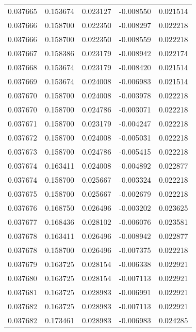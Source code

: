 \begin{tabular}{lrrrr}
0.037665    &  0.153674 &  0.023127 & -0.008550 &             0.021514 \\
0.037666    &  0.158700 &  0.022350 & -0.008297 &             0.022218 \\
0.037666    &  0.158700 &  0.022350 & -0.008559 &             0.022218 \\
0.037667    &  0.158386 &  0.023179 & -0.008942 &             0.022174 \\
0.037668    &  0.153674 &  0.023179 & -0.008420 &             0.021514 \\
0.037669    &  0.153674 &  0.024008 & -0.006983 &             0.021514 \\
0.037670    &  0.158700 &  0.024008 & -0.003978 &             0.022218 \\
0.037670    &  0.158700 &  0.024786 & -0.003071 &             0.022218 \\
0.037671    &  0.158700 &  0.023179 & -0.004247 &             0.022218 \\
0.037672    &  0.158700 &  0.024008 & -0.005031 &             0.022218 \\
0.037673    &  0.158700 &  0.024786 & -0.005415 &             0.022218 \\
0.037674    &  0.163411 &  0.024008 & -0.004892 &             0.022877 \\
0.037674    &  0.158700 &  0.025667 & -0.003324 &             0.022218 \\
0.037675    &  0.158700 &  0.025667 & -0.002679 &             0.022218 \\
0.037676    &  0.168750 &  0.026496 & -0.003202 &             0.023625 \\
0.037677    &  0.168436 &  0.028102 & -0.006076 &             0.023581 \\
0.037678    &  0.163411 &  0.026496 & -0.008942 &             0.022877 \\
0.037678    &  0.158700 &  0.026496 & -0.007375 &             0.022218 \\
0.037679    &  0.163725 &  0.028154 & -0.006338 &             0.022921 \\
0.037680    &  0.163725 &  0.028154 & -0.007113 &             0.022921 \\
0.037681    &  0.163725 &  0.028983 & -0.006991 &             0.022921 \\
0.037682    &  0.163725 &  0.028983 & -0.007113 &             0.022921 \\
0.037682    &  0.173461 &  0.028983 & -0.006983 &             0.024285 \\

\end{tabular}
